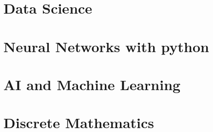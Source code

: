 \documentclass[a4paper,12pt]{book}
\begin{document}
\chapter{Data Science}

\chapter{Neural Networks with python}

\chapter{AI and Machine Learning}

\chapter{Discrete Mathematics}

\end{document}
